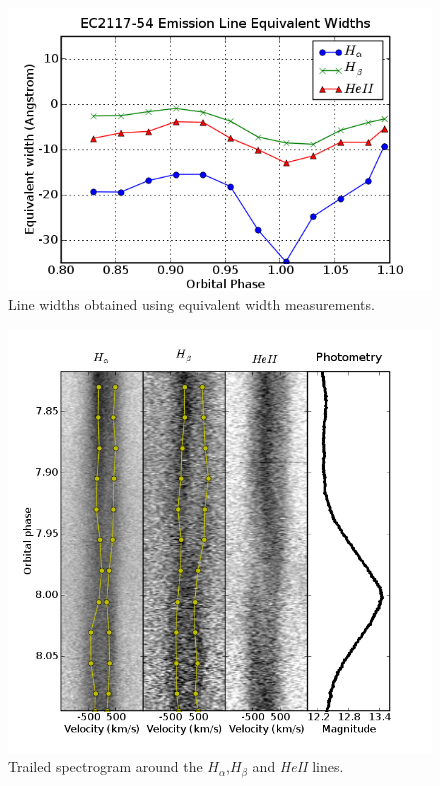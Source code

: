 \begin{figure}
 \centering
 \includegraphics[width = 0.8\columnwidth, bb=0 0 600 400]{images/lw_ew.png}
 \caption{Line widths obtained using equivalent width measurements.}
 \label{lw_ew}
\end{figure}



\begin{figure}
 \centering
 \includegraphics[width = \columnwidth, bb=0 0 800 800]{images/specgram.png}
 \caption{Trailed spectrogram around the $H_{\alpha}$,$H_{\beta}$ and \textit{HeII} lines.}
 \label{specgram}
\end{figure}





